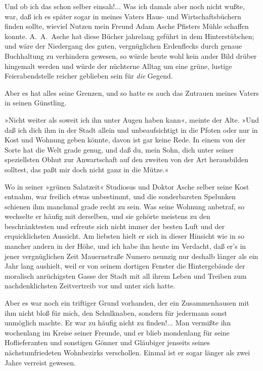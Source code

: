 Und ob ich das schon selber einsah!... Was ich damals aber noch
nicht wußte, war, daß ich es später sogar in meines Vaters Haus-
und Wirtschaftsbüchern finden sollte, wieviel Nutzen mein Freund
Adam Asche Pfisters Mühle schaffen konnte. A.~A.~Asche hat diese
Bücher jahrelang geführt in dem Hinterstübchen; und wäre der
Niedergang des guten, vergnüglichen Erdenflecks durch genaue
Buchhaltung zu verhindern gewesen, so würde heute wohl kein ander
Bild drüber hingemalt werden und würde der nüchterne Alltag um eine
grüne, lustige Feierabendstelle reicher geblieben sein für
\emph{die} Gegend.

Aber es hat alles seine Grenzen, und so hatte es auch das Zutrauen
meines Vaters in seinen Günstling.

»Nicht weiter als soweit ich ihn unter Augen haben kann«, meinte
der Alte. »Und daß ich dich ihm in der Stadt allein und
unbeaufsichtigt in die Pfoten oder nur in Kost und Wohnung geben
könnte, davon ist gar keine Rede. In einem von der Sorte hat die
Welt grade genug, und daß du, mein Sohn, dich unter seiner
speziellsten Obhut zur Anwartschaft auf den zweiten von der Art
herausbilden solltest, das paßt mir doch nicht ganz in die Mütze.«

Wo in seiner »grünen Salatzeit« Studiosus und Doktor Asche selber
seine Kost entnahm, war freilich etwas unbestimmt, und die
sonderbarsten Spelunken schienen ihm manchmal grade recht zu sein.
Was seine Wohnung anbetraf, so wechselte er häufig mit derselben,
und sie gehörte meistens zu den beschränktesten und erfreute sich
nicht immer der besten Luft und der erquicklichsten Aussicht. Am
liebsten hielt er sich in dieser Hinsicht wie in so mancher andern
in der Höhe, und ich habe ihn heute im Verdacht, daß er's in jener
vergnüglichen Zeit Mauernstraße Numero neunzig nur deshalb länger
als ein Jahr lang aushielt, weil er von seinem dortigen Fenster die
Hintergebäude der moralisch anrüchigsten Gasse der Stadt mit all
ihrem Leben und Treiben zum nachdenklichsten Zeitvertreib vor und
unter sich hatte.

Aber es war noch ein triftiger Grund vorhanden, der ein
Zusammenhausen mit ihm nicht bloß für mich, den Schulknaben,
sondern für jedermann sonst unmöglich machte. Er war zu häufig
nicht zu finden!... Man vermißte ihn wochenlang im Kreise seiner
Freunde, und er blieb mondenlang für seine Hoflieferanten und
sonstigen Gönner und Gläubiger jenseits seines nächstumfriedeten
Wohnbezirks verschollen. Einmal ist er sogar länger als zwei Jahre
verreist gewesen.

